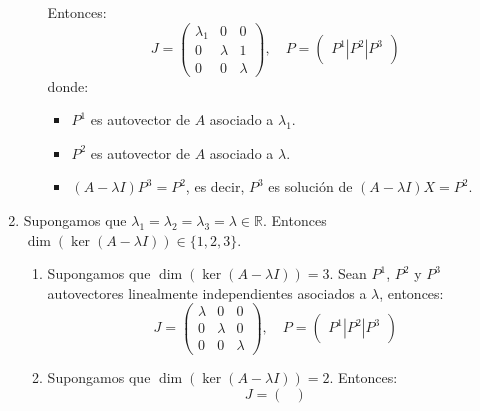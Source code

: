 \begin{enumerate}
\begin{enumerate}
                    Entonces:
                    $$J = \begin{pmatrix}
                            \lambda_1 & 0       & 0       \\
                            0         & \lambda & 1       \\
                            0         & 0       & \lambda
                        \end{pmatrix}, \quad
                        P = \begin{pmatrix}
                            P^1 | P^2 | P^3
                        \end{pmatrix}$$
                    donde:
                    \begin{itemize}
                        \item $P^1$ es autovector de $A$ asociado a $\lambda_1$.
                        \item $P^2$ es autovector de $A$ asociado a $\lambda$.
                        \item $(A - \lambda I)P^3 = P^2$, es decir, $P^3$ es solución de $(A - \lambda I)X = P^2$.
                    \end{itemize}
          \end{enumerate}
    \item Supongamos que $\lambda_1 = \lambda_2 = \lambda_3 = \lambda \in \mathbb{R}$.
          Entonces $\dim(\ker(A - \lambda I)) \in \{1, 2, 3\}$.
          \begin{enumerate}
              \item Supongamos que $\dim(\ker(A - \lambda I)) = 3$.
                    Sean $P^1$, $P^2$ y $P^3$ autovectores linealmente independientes asociados a $\lambda$, entonces:
                    $$J = \begin{pmatrix}
                            \lambda & 0       & 0       \\
                            0       & \lambda & 0       \\
                            0       & 0       & \lambda
                        \end{pmatrix}, \quad
                        P = \begin{pmatrix}
                            P^1 | P^2 | P^3
                        \end{pmatrix}$$
              \item Supongamos que $\dim(\ker(A - \lambda I)) = 2$.
                    Entonces:
                    $$J = \begin{pmatrix}

\end{pmatrix}$$
\end{enumerate}
\end{enumerate}
